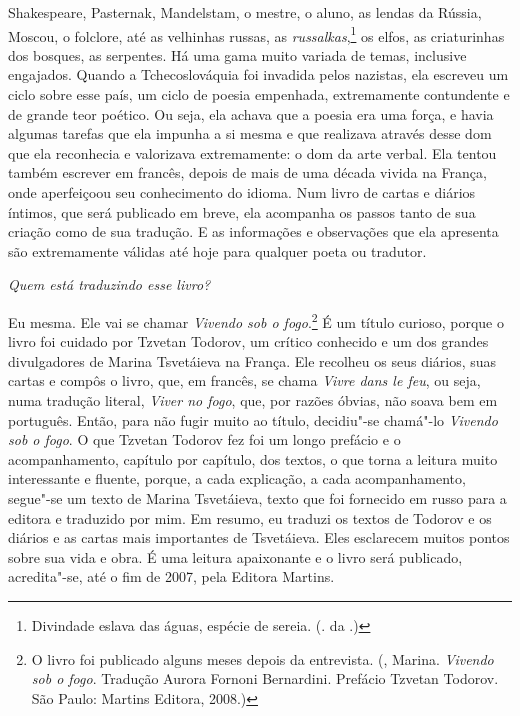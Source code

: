 Shakespeare, Pasternak, Mandelstam, o mestre, o aluno, as lendas da Rússia, Moscou, o folclore, até as velhinhas russas, as
\emph{russalkas},\footnote{Divindade eslava das águas, espécie de
  sereia. (. da .)} os elfos, as criaturinhas dos bosques, as
serpentes. Há uma gama muito variada de temas, inclusive engajados.
Quando a Tchecoslováquia foi invadida pelos nazistas, ela escreveu um
ciclo sobre esse país, um ciclo de poesia empenhada, extremamente
contundente e de grande teor poético. Ou seja, ela achava que a poesia
era uma força, e havia algumas tarefas que ela impunha a si mesma e que
realizava através desse dom que ela reconhecia e valorizava
extremamente: o dom da arte verbal. Ela tentou também escrever em
francês, depois de mais de uma década vivida na França, onde aperfeiçoou
seu conhecimento do idioma. Num livro de cartas e diários íntimos, que
será publicado em breve, ela acompanha os passos tanto de sua criação
como de sua tradução. E as informações e observações que ela apresenta
são extremamente válidas até hoje para qualquer poeta ou tradutor.

\medskip

\emph{Quem está traduzindo esse livro?}

Eu mesma. Ele vai se chamar \emph{Vivendo sob o fogo}.\footnote{O livro foi publicado alguns meses depois da entrevista. (, Marina. \emph{Vivendo sob o
  fogo}. Tradução Aurora Fornoni Bernardini. Prefácio Tzvetan Todorov.
  São Paulo: Martins Editora, 2008.)} É um título curioso, porque o livro
foi cuidado por Tzvetan Todorov, um crítico conhecido e um dos grandes
divulgadores de Marina Tsvetáieva na França. Ele recolheu os seus
diários, suas cartas e compôs o livro, que, em francês, se chama
\emph{Vivre dans le feu}, ou seja, numa tradução literal, \emph{Viver no
fogo}, que, por razões óbvias, não soava bem em português. Então, para
não fugir muito ao título, decidiu"-se chamá"-lo \emph{Vivendo sob o fogo}.
O que Tzvetan Todorov fez foi um longo prefácio e o acompanhamento,
capítulo por capítulo, dos textos, o que torna a leitura muito
interessante e fluente, porque, a cada explicação, a cada
acompanhamento, segue"-se um texto de Marina Tsvetáieva, texto que foi
fornecido em russo para a editora e traduzido por mim. Em resumo, eu
traduzi os textos de Todorov e os diários e as cartas mais importantes
de Tsvetáieva. Eles esclarecem muitos pontos sobre sua vida e obra. É
uma leitura apaixonante e o livro será publicado, acredita"-se, até o fim
de 2007, pela Editora Martins.

